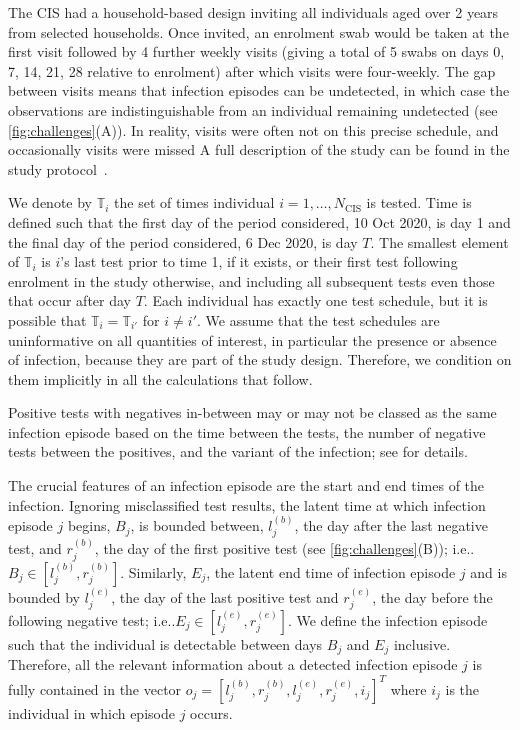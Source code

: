 \documentclass[12pt]{article}
\makeatletter
\newcommand{\Ncis}{N_\text{CIS}}
\newcommand{\sched}{\mathbb{T}}
\DeclareRobustCommand\onedot{\futurelet\@let@token\@onedot}
\def\@onedot{\ifx\@let@token.\else.\null\fi\xspace}
\def\eg{e.g\onedot} \def\Eg{{E.g}\onedot}
\def\ie{i.e\onedot} \def\Ie{{I.e}\onedot}
\makeatother
\begin{document}
The CIS had a household-based design inviting all individuals aged over 2 years from selected households.
Once invited, an enrolment swab would be taken at the first visit followed by 4 further weekly visits (giving a total of 5 swabs on days 0, 7, 14, 21, 28 relative to enrolment) after which visits were four-weekly.
The gap between visits means that infection episodes can be undetected, in which case the observations are indistinguishable from an individual remaining undetected (see \cref{fig:challenges}(A)).
In reality, visits were often not on this precise schedule, and occasionally visits were missed %
A full description of the study can be found in the study protocol~\citep{cisProtocol}.

We denote by $\sched_i$ the set of times individual $i = 1, \dots, \Ncis$ is tested.
Time is defined such that the first day of the period considered, 10 Oct 2020, is day 1 and the final day of the period considered, 6 Dec 2020, is day $T$.
The smallest element of $\sched_i$ is $i$'s last test prior to time 1, if it exists, or their first test following enrolment in the study otherwise, and including all subsequent tests even those that occur after day $T$.
Each individual has exactly one test schedule, but it is possible that $\sched_i = \sched_{i'}$ for $i \neq i'$.
We assume that the test schedules are uninformative on all quantities of interest, in particular the presence or absence of infection, because they are part of the study design.
Therefore, we condition on them implicitly in all the calculations that follow.


Positive tests with negatives in-between may or may not be classed as the same infection episode based on the time between the tests, the number of negative tests between the positives, and the variant of the infection; see \citet{weiRisk} for details.

The crucial features of an infection episode are the start and end times of the infection.
Ignoring misclassified test results, the latent time at which infection episode $j$ begins, $B_j$, is bounded between, $l_j^{(b)}$, the day after the last negative test, and $r_j^{(b)}$, the day of the first positive test (see \cref{fig:challenges}(B)); \ie $B_j \in [l_j^{(b)}, r_j^{(b)}]$.
Similarly, $E_j$, the latent end time of infection episode $j$ and is bounded by $l_j^{(e)}$, the day of the last positive test and $r_j^{(e)}$, the day before the following negative test; \ie $E_j \in [l_j^{(e)}, r_j^{(e)}]$.
We define the infection episode such that the individual is detectable between days $B_j$ and $E_j$ inclusive.
Therefore, all the relevant information about a detected infection episode $j$ is fully contained in the vector $o_j = [l_j^{(b)}, r_j^{(b)}, l_j^{(e)}, r_j^{(e)}, i_j]^T$ where $i_j$ is the individual in which episode $j$ occurs.
\end{document}
